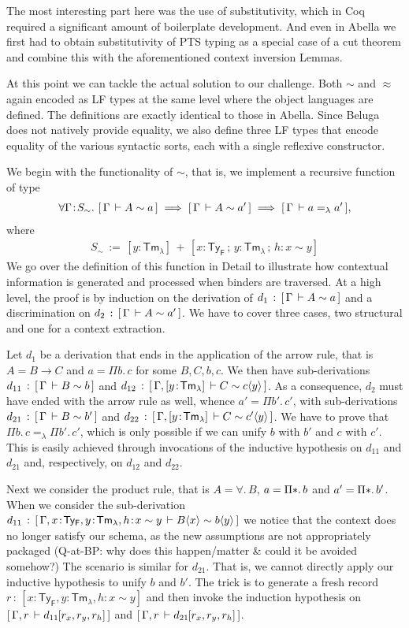 \documentclass[a4paper,UKenglish]{lipics-v2016}
\newcommand{\ms}{\,}
\newcommand{\mrel}[1]{\mathrel{\ms #1 \ms}}
\newcommand{\OF}{\mrel{:}}
\newcommand{\mAll}[1]{\ensuremath{\forall} #1.\ms\ms}
\newcommand{\eqdef}{\mrel{:=}}
\newcommand{\TyF}{\ensuremath{\mathsf{Ty_{F}}}}
\newcommand{\TmL}{\ensuremath{\mathsf{Tm_{\lambda}}}}
\newcommand{\of}{\ensuremath{\!:\!}}
\newcommand{\tyr}{\mathrel{\sim}}
\newcommand{\tmr}{\mathrel{\approx}}
\newcommand{\lpApp}[2]{#1\langle#2\rangle}
\newcommand{\Prp}{\ensuremath{\textrm{\textasteriskcentered}}}
\newcommand{\All}{\ensuremath{\forall.\,}}
\newcommand{\Prod}[1]{\ensuremath{\Pi #1.\,}}
\newcommand{\subst}[1]{\hphantom{|}\!\![{#1}]}
\begin{document}
The most interesting part here was the use of substitutivity, which in Coq required a significant amount of boilerplate development.
And even in Abella we first had to obtain substitutivity of PTS typing as a special case of a cut theorem and combine this with the aforementioned context inversion Lemmas.

At this point we can tackle the actual solution to our challenge.
Both $\tyr$ and $\tmr$ again encoded as LF types at the same level where the object languages are defined.
The definitions are exactly identical to those in Abella.
Since Beluga does not natively provide equality, we also define three LF types that encode equality of the various syntactic sorts, each with a single reflexive constructor.

We begin with the functionality of $\tyr$, that is, we implement a recursive function of type
\begin{align*}
  \mAll{\Gamma \of S_{\tyr}} \bc{\Gamma}{A \tyr a} \implies \bc{\Gamma}{A \tyr a'} \implies \bc{\Gamma}{a =_{\lambda} a'},
\end{align*}
where
\begin{align*}
  S_{\tyr} \eqdef [y \of \TmL] \mrel{+} [x\of\TyF \mrel{;} y\of\TmL \mrel{;} h\of x \tyr y]
\end{align*}
We go over the definition of this function in Detail to illustrate how contextual information is generated and processed when binders are traversed.
At a high level, the proof is by induction on the derivation of $d_1 \OF \bc{\Gamma}{A \tyr a}$ and a discrimination on $d_2 \OF \bc{\Gamma}{A \tyr a'}$.
We have to cover three cases, two structural and one for a context extraction.

Let $d_1$ be a derivation that ends in the application of the arrow rule, that is $A = B \to C$ and $a = \Prod{b}c$ for some $B,C,b,c$.
We then have sub-derivations $d_{11} \OF \bc{\Gamma}{B \tyr b}$ and $d_{12} \OF \bc{\Gamma, [y \of \TmL]}{C \tyr \lpApp{c}{y}}$.
As a consequence, $d_2$ must have ended with the arrow rule as well, whence $a' = \Prod{b'}c'$, with sub-derivations $d_{21} \OF \bc{\Gamma}{B \tyr b'}$ and $d_{22} \OF \bc{\Gamma, [y \of \TmL]}{C \tyr \lpApp{c'}{y}}$.
We have to prove that $\Prod{b}c =_{\lambda} \Prod{b'}c'$, which is only possible if we can unify $b$ with $b'$ and $c$ with $c'$.
This is easily achieved through invocations of the inductive hypothesis on $d_{11}$ and $d_{21}$ and, respectively, on $d_{12}$ and $d_{22}$.

Next we consider the product rule, that is $A = \All B$, $a = \Prod{\Prp} b$ and $a' = \Prod{\Prp} b'$.
When we consider the sub-derivation $d_{11} \OF \bc{\Gamma, x \of \TyF, y \of \TmL, h \of x \tyr y}{\lpApp{B}{x} \tyr \lpApp{b}{y}}$ we notice that the context does no longer satisfy our schema, as the new assumptions are not appropriately packaged (Q-at-BP: why does this happen/matter \& could it be avoided somehow?)
The scenario is similar for $d_{21}$.
That is, we cannot directly apply our inductive hypothesis to unify $b$ and $b'$.
The trick is to generate a fresh record $r \OF [x \of \TyF, y \of \TmL, h \of x \tyr y]$  and then invoke the induction hypothesis on $\bc{\Gamma, r}{d_{11}\subst{r_x,r_y,r_h}}$ and $\bc{\Gamma, r}{d_{21}\subst{r_x,r_y,r_h}}$.
\end{document}
